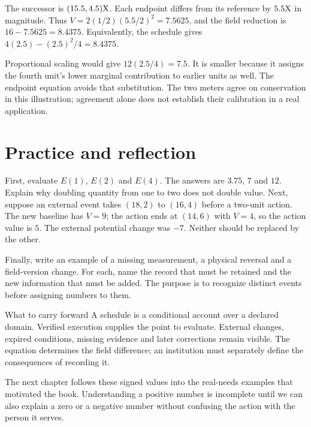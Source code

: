 The successor is $(15.5,4.5)\mathrm{X}$. Each endpoint differs from its reference by $5.5\mathrm{X}$ in magnitude. Thus $V=2(1/2)(5.5/2)^2=7.5625$, and the field reduction is $16-7.5625=8.4375$. Equivalently, the schedule gives $4(2.5)-(2.5)^2/4=8.4375$.

Proportional scaling would give $12(2.5/4)=7.5$. It is smaller because it assigns the fourth unit's lower marginal contribution to earlier units as well. The endpoint equation avoids that substitution. The two meters agree on conservation in this illustration; agreement alone does not establish their calibration in a real application.

\section{Practice and reflection}
First, evaluate $E(1)$, $E(2)$ and $E(4)$. The answers are $3.75$, $7$ and $12$. Explain why doubling quantity from one to two does not double value. Next, suppose an external event takes $(18,2)$ to $(16,4)$ before a two-unit action. The new baseline has $V=9$; the action ends at $(14,6)$ with $V=4$, so the action value is $5$. The external potential change was $-7$. Neither should be replaced by the other.

Finally, write an example of a missing measurement, a physical reversal and a field-version change. For each, name the record that must be retained and the new information that must be added. The purpose is to recognize distinct events before assigning numbers to them.

\begin{intuitionbox}{What to carry forward}
A schedule is a conditional account over a declared domain. Verified execution supplies the point to evaluate. External changes, expired conditions, missing evidence and later corrections remain visible. The equation determines the field difference; an institution must separately define the consequences of recording it.
\end{intuitionbox}

The next chapter follows these signed values into the real-needs examples that motivated the book. Understanding a positive number is incomplete until we can also explain a zero or a negative number without confusing the action with the person it serves.
